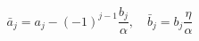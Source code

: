 \begin{equation}
\bar{a}_{j}=a_{j}-(-1)^{j-1}\frac{b_{j}}{\alpha},\quad
\bar{b}_{j}=b_{j}\frac{\eta}{\alpha}\label{coefrel}
\end{equation}

